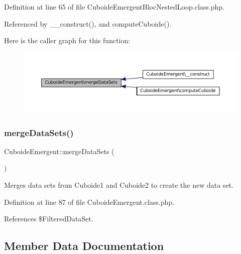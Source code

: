 Definition at line 65 of file Cuboide\+Emergent\+Bloc\+Nested\+Loop.\+class.\+php.



Referenced by \+\_\+\+\_\+construct(), and compute\+Cuboide().

Here is the caller graph for this function\+:\nopagebreak
\begin{figure}[H]
\begin{center}
\leavevmode
\includegraphics[width=350pt]{class_cuboide_emergent_af81c6eabb87ff572c306a96334c7062d_icgraph}
\end{center}
\end{figure}
\mbox{\label{class_cuboide_emergent_af81c6eabb87ff572c306a96334c7062d}} 
\subsubsection{\texorpdfstring{merge\+Data\+Sets()}{mergeDataSets()}\hspace{0.1cm}{\footnotesize\ttfamily [2/2]}}
{\footnotesize\ttfamily Cuboide\+Emergent\+::merge\+Data\+Sets (\begin{DoxyParamCaption}{ }\end{DoxyParamCaption})\hspace{0.3cm}{\ttfamily [protected]}}

Merges data sets from Cuboide1 and Cuboide2 to create the new data set. 

Definition at line 87 of file Cuboide\+Emergent.\+class.\+php.



References \$\+Filtered\+Data\+Set.



\subsection{Member Data Documentation}
\mbox{\label{class_cuboide_emergent_ac22d5c3ee5743695016047ae7ca14534}} 
